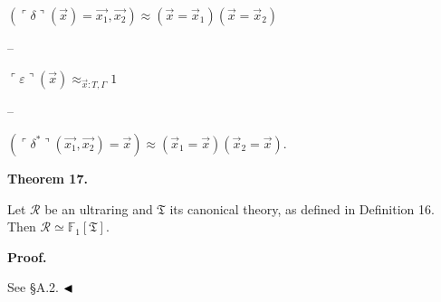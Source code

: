 $(\ulcorner\delta\urcorner(\vec{x})=\vec{x_{1}},\vec{x_{2}})\approx(\vec{x}=%
\vec{x}_{1})(\vec{x}=\vec{x}_{2})$\par
 
 
 
\par\noindent  – 
 
$\ulcorner\varepsilon\urcorner(\vec{x})\approx_{\vec{x}:T,\Gamma}1$\par
 
 
 
\par\noindent  – 
 
$(\ulcorner\delta^{*}\urcorner(\vec{x_{1}},\vec{x_{2}})=\vec{x})\approx(\vec{x}%
_{1}=\vec{x})(\vec{x}_{2}=\vec{x})$.\par
 
 
  
 
  
 
 
 
\par\medskip\noindent\textbf{Theorem 17.}\par
 
 
Let $\mathcal{R}$ be an ultraring and $\mathfrak{T}$ its canonical theory, as defined in Definition 16. Then $\mathcal{R}\simeq\mathbb{F}_{1}[\mathfrak{T}]$.\par
 
 
 
 
 
\par\medskip\noindent\textbf{Proof.}\par
 
 
See §A.2. $\hfill\blacktriangleleft$\par
 
 
 
 
 
